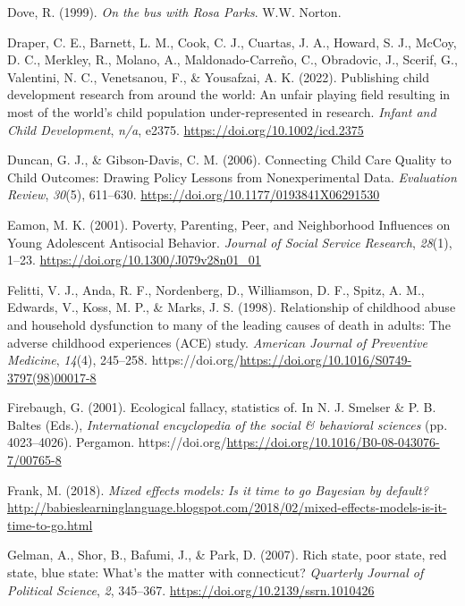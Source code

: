 \documentclass[
  letterpaper,
  DIV=11,
  numbers=noendperiod]{scrreprt}
\newlength{\cslhangindent}
\newlength{\cslentryspacingunit} %
\newenvironment{CSLReferences}[2] %
 {%
  \setlength{\parindent}{0pt}
  \ifodd #1
  \let\oldpar\par
  \def\par{\hangindent=\cslhangindent\oldpar}
  \fi
  \setlength{\parskip}{#2\cslentryspacingunit}
 }%
 {}
\begin{document}
\begin{CSLReferences}{1}{0}
\leavevmode{}%
Dove, R. (1999). \emph{On the bus with {R}osa {P}arks}. W.W. Norton.

\leavevmode{}%
Draper, C. E., Barnett, L. M., Cook, C. J., Cuartas, J. A., Howard, S.
J., McCoy, D. C., Merkley, R., Molano, A., Maldonado-Carreño, C.,
Obradovic, J., Scerif, G., Valentini, N. C., Venetsanou, F., \&
Yousafzai, A. K. (2022). Publishing child development research from
around the world: An unfair playing field resulting in most of the
world's child population under-represented in research. \emph{Infant and
Child Development}, \emph{n/a}, e2375.
\url{https://doi.org/10.1002/icd.2375}

\leavevmode{}%
Duncan, G. J., \& Gibson-Davis, C. M. (2006). {Connecting Child Care
Quality to Child Outcomes: Drawing Policy Lessons from Nonexperimental
Data}. \emph{Evaluation Review}, \emph{30}(5), 611--630.
\url{https://doi.org/10.1177/0193841X06291530}

\leavevmode{}%
Eamon, M. K. (2001). {Poverty, Parenting, Peer, and Neighborhood
Influences on Young Adolescent Antisocial Behavior}. \emph{Journal of
Social Service Research}, \emph{28}(1), 1--23.
\url{https://doi.org/10.1300/J079v28n01_01}

\leavevmode{}%
Felitti, V. J., Anda, R. F., Nordenberg, D., Williamson, D. F., Spitz,
A. M., Edwards, V., Koss, M. P., \& Marks, J. S. (1998). Relationship of
childhood abuse and household dysfunction to many of the leading causes
of death in adults: The adverse childhood experiences (ACE) study.
\emph{American Journal of Preventive Medicine}, \emph{14}(4), 245--258.
https://doi.org/\url{https://doi.org/10.1016/S0749-3797(98)00017-8}

\leavevmode{}%
Firebaugh, G. (2001). Ecological fallacy, statistics of. In N. J.
Smelser \& P. B. Baltes (Eds.), \emph{International encyclopedia of the
social \& behavioral sciences} (pp. 4023--4026). Pergamon.
https://doi.org/\url{https://doi.org/10.1016/B0-08-043076-7/00765-8}

\leavevmode{}%
Frank, M. (2018). \emph{Mixed effects models: Is it time to go
{B}ayesian by default?}
\url{http://babieslearninglanguage.blogspot.com/2018/02/mixed-effects-models-is-it-time-to-go.html}

\leavevmode{}%
Gelman, A., Shor, B., Bafumi, J., \& Park, D. (2007). Rich state, poor
state, red state, blue state: What's the matter with connecticut?
\emph{Quarterly Journal of Political Science}, \emph{2}, 345--367.
\url{https://doi.org/10.2139/ssrn.1010426}


\end{CSLReferences}
\end{document}
